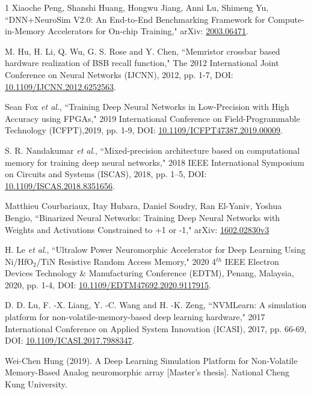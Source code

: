 \documentclass[journal]{IEEEtran}
\begin{document}
\begin{thebibliography}{1}
Xiaoche Peng, Shanshi Huang, Hongwu Jiang, Anni Lu, Shimeng Yu, ``DNN+NeuroSim V2.0: An End-to-End Benchmarking Framework for Compute-in-Memory Accelerators for On-chip Training," arXiv: \href{https://arxiv.org/abs/2003.06471} {2003.06471}.

M. Hu, H. Li, Q. Wu, G. S. Rose and Y. Chen, ``Memristor crossbar based hardware realization of BSB recall function," The 2012 International Joint Conference on Neural Networks (IJCNN), 2012, pp. 1-7, DOI: \href{https://ieeexplore.ieee.org/document/6252563}{10.1109/IJCNN.2012.6252563}.

Sean Fox \emph{et al}., ``Training Deep Neural Networks in Low-Precision with High Accuracy using FPGAs," 2019 International Conference on Field-Programmable Technology (ICFPT),2019, pp. 1-9, DOI: \href{https://ieeexplore.ieee.org/document/8977908}{10.1109/ICFPT47387.2019.00009}.

S. R. Nandakumar \emph{et al}., ``Mixed-precision architecture based on computational memory for training deep neural networks," 2018 IEEE International Symposium on Circuits and Systems (ISCAS), 2018, pp. 1–5, DOI: \href{https://ieeexplore.ieee.org/document/8351656}{10.1109/ISCAS.2018.8351656}.

Matthieu Courbariaux, Itay Hubara, Daniel Soudry, Ran El-Yaniv, Yoshua Bengio, ``Binarized Neural Networks: Training Deep Neural Networks with Weights and Activations Constrained to +1 or -1," arXiv: \href{https://arxiv.org/abs/1602.02830v3}{1602.02830v3}

H. Le \emph{et al}., ``Ultralow Power Neuromorphic Accelerator for Deep Learning Using Ni/HfO$_2$/TiN Resistive Random Access Memory," 2020 4$^{th}$ IEEE Electron Devices Technology \& Manufacturing Conference (EDTM), Penang, Malaysia, 2020, pp. 1-4, DOI: \href{https://ieeexplore.ieee.org/document/9117915} {10.1109/EDTM47692.2020.9117915}.

D. D. Lu, F. -X. Liang, Y. -C. Wang and H. -K. Zeng, ``NVMLearn: A simulation platform for non-volatile-memory-based deep learning hardware," 2017 International Conference on Applied System Innovation (ICASI), 2017, pp. 66-69, DOI: \href{https://ieeexplore.ieee.org/abstract/document/7988347}{10.1109/ICASI.2017.7988347}.

Wei-Chen Hung (2019). A Deep Learning Simulation Platform for Non-Volatile Memory-Based Analog neuromorphic array [Master’s thesis]. National Cheng Kung University.


\end{thebibliography}
\end{document}
